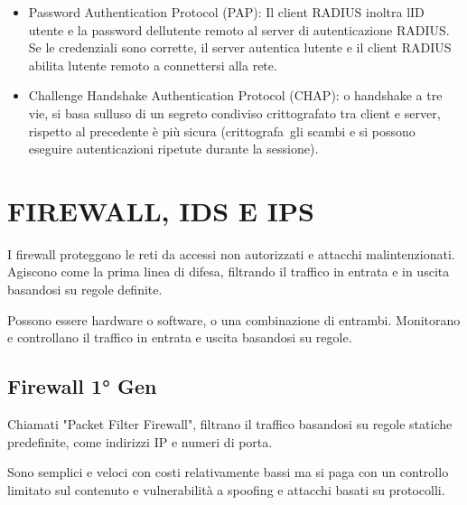 \documentclass[
]{article}
\providecommand{\tightlist}{%
  \setlength{\itemsep}{0pt}\setlength{\parskip}{0pt}}
\begin{document}
\begin{itemize}
\tightlist
\item
  {Password Authentication Protocol (PAP)}{: Il client RADIUS inoltra
  l\textquotesingle ID utente e la password dell\textquotesingle utente
  remoto al server di autenticazione RADIUS. Se le credenziali sono
  corrette, il server autentica l\textquotesingle utente e il client
  RADIUS abilita l\textquotesingle utente remoto a connettersi alla
  rete.}
\end{itemize}

{}

\begin{itemize}
\tightlist
\item
  {Challenge Handshake Authentication Protocol (CHAP)}{: o handshake a
  tre vie, si basa sull\textquotesingle uso di un segreto condiviso
  crittografato tra client e server, rispetto al precedente è più sicura
  }{(crittografa}{~gli scambi e si possono eseguire autenticazioni
  ripetute durante la sessione).}
\end{itemize}

\section{\texorpdfstring{{FIREWALL, IDS E
IPS}}{FIREWALL, IDS E IPS}}\label{h.29tda7su1s7p}

{I firewall proteggono le reti da accessi non autorizzati e attacchi
malintenzionati. Agiscono come la prima linea di difesa, filtrando il
traffico in entrata e in uscita basandosi su regole definite.}

{}

{Possono essere hardware o software, o una combinazione di entrambi.
Monitorano e controllano il traffico in entrata e uscita basandosi su
regole.}

\subsection{\texorpdfstring{{Firewall 1°
Gen}}{Firewall 1° Gen}}\label{h.ls2gz5lj2rg2}

{Chiamati }{"Packet Filter Firewall"}{, filtrano il traffico basandosi
su regole statiche predefinite, come indirizzi IP e numeri di porta.}

{}

{Sono }{semplici }{e }{veloci }{con }{costi }{relativamente }{bassi }{ma
}{si paga con un }{controllo limitato }{sul contenuto e }{vulnerabilità
}{a spoofing e attacchi basati su protocolli.}
\end{document}
